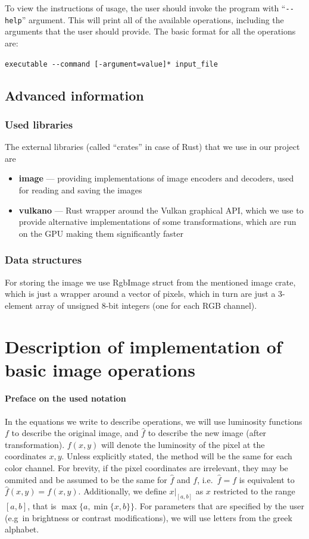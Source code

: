 \documentclass[12pt]{article}
\begin{document}
To view the instructions of usage, the user should invoke the program with ``\lstinline{--help}'' argument.
This will print all of the available operations, including the arguments that the user should provide.
The basic format for all the operations are:
\begin{center}
    \lstinline{executable --command [-argument=value]* input_file}
\end{center}

\subsection*{Advanced information}
\subsubsection*{Used libraries}
The external libraries (called ``crates'' in case of Rust) that we use in our project are
\begin{itemize}
    \item \textbf{image} --- providing implementations of image encoders and decoders,
          used for reading and saving the images
    \item \textbf{vulkano} --- Rust wrapper around the Vulkan graphical API,
          which we use to provide alternative implementations of some transformations,
          which are run on the GPU making them significantly faster
\end{itemize}

\subsubsection*{Data structures}
For storing the image we use RgbImage struct from the mentioned image crate,
which is just a wrapper around a vector of pixels, which in turn are just a 3-element array of unsigned 8-bit integers (one for each RGB channel).

\section*{Description of implementation of basic image operations}

\paragraph*{Preface on the used notation}
In the equations we write to describe operations, we will use luminosity functions $f$ to describe the original image, and $\hat{f}$ to describe the new image (after transformation).
$f(x,y)$ will denote the luminosity of the pixel at the coordinates $x,y$. Unless explicitly stated, the method will be the same for each color channel.
For brevity, if the pixel coordinates are irrelevant, they may be ommited and be assumed to be the same for $\hat{f}$ and $f$, i.e.\ $\hat{f}=f$ is equivalent to $\hat{f}(x,y) = f(x,y)$.
Additionally, we define $x|_{[a,b]}$ as $x$ restricted to the range $[a,b]$, that is $\max\{a, \min\{x,b\}\}$.
For parameters that are specified by the user (e.g\ in brightness or contrast modifications), we will use letters from the greek alphabet.
\end{document}
